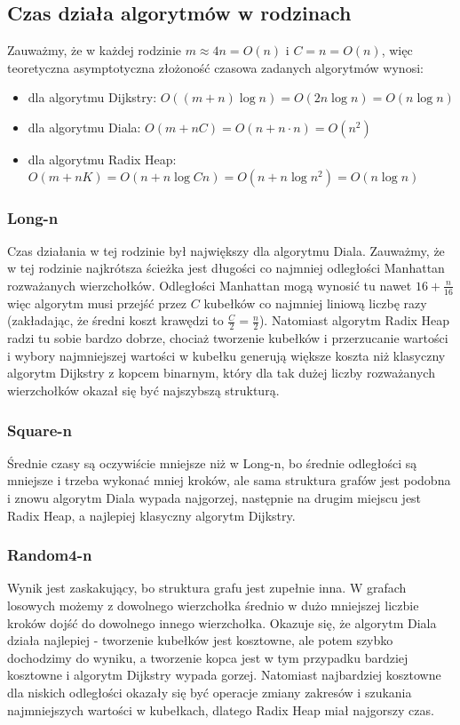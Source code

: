 \documentclass{article}
\begin{document}
\subsection{Czas działa algorytmów w rodzinach}
Zauważmy, że w każdej rodzinie $m\approx 4n=O(n)$ i $C=n=O(n)$, więc teoretyczna asymptotyczna złożoność czasowa zadanych algorytmów wynosi:
\begin{itemize}
\item dla algorytmu Dijkstry: $O((m+n)\log n)=O(2n\log n)=O(n\log n)$
\item dla algorytmu Diala: $O(m+nC)=O(n+n\cdot n)=O(n^2)$
\item dla algorytmu Radix Heap: $O(m+nK)=O(n+n \log Cn)=O(n+n\log n^2)=O(n\log n)$
\end{itemize}
\subsubsection{Long-n}
Czas działania w tej rodzinie był największy dla algorytmu Diala. Zauważmy, że w tej rodzinie najkrótsza ścieżka jest długości co najmniej odległości Manhattan rozważanych wierzchołków. Odległości Manhattan mogą wynosić tu nawet $16+\frac{n}{16}$ więc algorytm musi przejść przez $C$ kubełków co najmniej liniową liczbę razy (zakładając, że średni koszt krawędzi to $\frac{C}{2}=\frac{n}{2}$). Natomiast algorytm Radix Heap radzi tu sobie bardzo dobrze, chociaż tworzenie kubełków i przerzucanie wartości i wybory najmniejszej wartości w kubełku generują większe koszta niż klasyczny algorytm Dijkstry z kopcem binarnym, który dla tak dużej liczby rozważanych wierzchołków okazał się być najszybszą strukturą.
\subsubsection{Square-n}
Średnie czasy są oczywiście mniejsze niż w Long-n, bo średnie odległości są mniejsze i trzeba wykonać mniej kroków, ale sama struktura grafów jest podobna i znowu algorytm Diala wypada najgorzej, następnie na drugim miejscu jest Radix Heap, a najlepiej klasyczny algorytm Dijkstry.

\subsubsection{Random4-n}
Wynik jest zaskakujący, bo struktura grafu jest zupełnie inna. W grafach losowych możemy z dowolnego wierzchołka średnio w dużo mniejszej liczbie kroków dojść do dowolnego innego wierzchołka. Okazuje się, że algorytm Diala działa najlepiej - tworzenie kubełków jest kosztowne, ale potem szybko dochodzimy do wyniku, a tworzenie kopca jest w tym przypadku bardziej kosztowne i algorytm Dijkstry wypada gorzej. Natomiast najbardziej kosztowne dla niskich odległości okazały się być operacje zmiany zakresów i szukania najmniejszych wartości w kubełkach, dlatego Radix Heap miał najgorszy czas.
\end{document}
